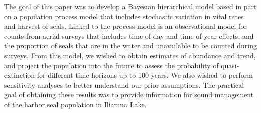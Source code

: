 \documentclass[]{risa}\usepackage[]{graphicx}\usepackage[]{color}
\begin{document}
The goal of this paper was to develop a Bayesian hierarchical model based in part on a population process model that includes stochastic variation in vital rates and harvest of seals. Linked to the process model is an observational model for counts from aerial surveys that includes time-of-day and time-of-year effects, and the proportion of seals that are in the water and unavailable to be counted during surveys.  From this model, we wished to obtain estimates of abundance and trend, and project the population into the future to assess the probability of quasi-extinction for different time horizons up to 100 years.  We also wished to perform sensitivity analyses to better understand our prior assumptions. The practical goal of obtaining these results was to provide information for sound management of the harbor seal population in Iliamna Lake.

\end{document}
